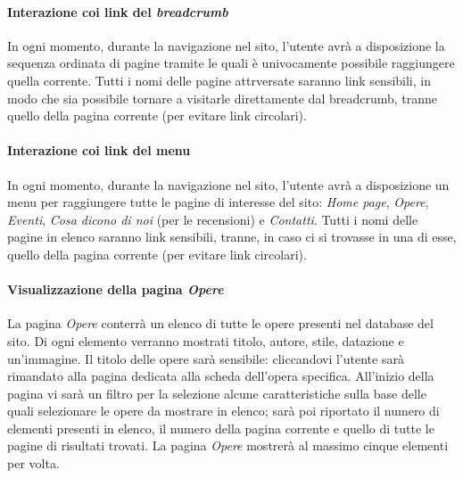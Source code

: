 \paragraph{Interazione coi link del \textit{breadcrumb}}
\label{analisi-casi-uso-attori-principali-utente-generico-2}
In ogni momento, durante la navigazione nel sito, l'utente avrà a disposizione la sequenza ordinata di pagine tramite le quali è univocamente possibile raggiungere quella corrente. Tutti i nomi delle pagine attrversate saranno link sensibili, in modo che sia possibile tornare a visitarle direttamente dal breadcrumb, tranne quello della pagina corrente (per evitare link circolari).


\paragraph{Interazione coi link del menu}
\label{analisi-casi-uso-attori-principali-utente-generico-3}
In ogni momento, durante la navigazione nel sito, l'utente avrà a disposizione un menu per raggiungere tutte le pagine di interesse del sito: \textit{Home page}, \textit{Opere}, \textit{Eventi}, \textit{Cosa dicono di noi} (per le recensioni) e \textit{Contatti}. Tutti i nomi delle pagine in elenco saranno link sensibili, tranne, in caso ci si trovasse in una di esse, quello della pagina corrente (per evitare link circolari).


\paragraph{Visualizzazione della pagina \textit{Opere}}
\label{analisi-casi-uso-attori-principali-utente-generico-4}
La pagina \textit{Opere} conterrà un elenco di tutte le opere presenti nel database del sito. Di ogni elemento verranno mostrati titolo, autore, stile, datazione e un'immagine. Il titolo delle opere sarà sensibile: cliccandovi l'utente sarà rimandato alla pagina dedicata alla scheda dell'opera specifica. All'inizio della pagina vi sarà un filtro per la selezione alcune caratteristiche sulla base delle quali selezionare le opere da mostrare in elenco; sarà poi riportato il numero di elementi presenti in elenco, il numero della pagina corrente e quello di tutte le pagine di risultati trovati. La pagina \textit{Opere} mostrerà al massimo cinque elementi per volta.


